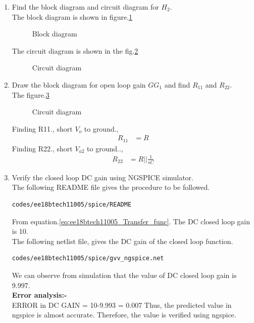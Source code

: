 \begin{enumerate}[label=\arabic*.,ref=\theenumi]
\item Find the block diagram and circuit diagram for $H_2$.\\
\solution The block diagram is shown in figure.\ref{fig:H_blockdiagram}
\begin{figure}[!hbt]
	\begin{center}
			\resizebox{\columnwidth}{!}{}
	\end{center}
\caption{Block diagram}
\label{fig:H_blockdiagram}
\end{figure}
The circuit diagram is shown in the fig.\ref{fig:H_circuit}
\begin{figure}[!hbt]
	\begin{center}
			\resizebox{\columnwidth}{!}{}
	\end{center}
\caption{Circuit diagram}
\label{fig:H_circuit}
\end{figure}
\item Draw the block diagram for open loop gain $GG_1$ and find $R_{11}$ and $R_{22}$.\\
\solution The figure.\ref{fig:G_blockdiagram}
\begin{figure}[!hbt]
	\begin{center}
			\resizebox{\columnwidth}{!}{}
	\end{center}
\caption{Circuit diagram}
\label{fig:G_blockdiagram}
\end{figure}
Finding R11., short $V_o$ to ground.,
\begin{align}
    R_{11} &= R
\end{align}
Finding R22., short $V_{a2}$ to ground..,
\begin{align}
    R_{22} &= R  || \frac{1}{sC}
\end{align}
\item Verify the closed loop DC gain using NGSPICE simulator.
\\
\solution 
The following README file gives the procedure to be followed.
\begin{lstlisting}
codes/ee18btech11005/spice/README
\end{lstlisting}
From equation.\ref{eq:ee18btech11005_Transfer_func}.
The DC closed loop gain is 10.\\
The following netlist file, gives the DC gain of the closed loop function.
\begin{lstlisting}
codes/ee18btech11005/spice/gvv_ngspice.net
\end{lstlisting}
We can observe from simulation that the value of DC closed loop gain is 9.997.\\
\textbf{Error analysis:-}\\
ERROR in DC GAIN = 10-9.993 = 0.007
Thus, the predicted value in ngspice is almost accurate.
Therefore, the value is verified using ngspice.


\end{enumerate}
